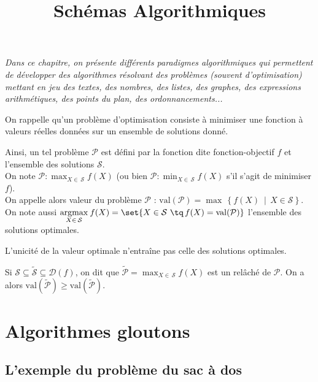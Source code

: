 \documentclass{scrartcl}
\title{Schémas Algorithmiques}
\author{}
\date{}
\newcommand{\1}{\bbm{1}}
\begin{document}
	\maketitle
	\begin{center}
		\textsl{Dans ce chapitre, on présente différents paradigmes algorithmiques qui permettent de développer des algorithmes résolvant des problèmes (souvent d'optimisation) mettant en jeu des textes, des nombres, des listes, des graphes, des expressions arithmétiques, des points du plan, des ordonnancements...}
	\end{center}
	
	 On rappelle qu'un problème d'optimisation consiste à minimiser une fonction à valeurs réelles données sur un ensemble de solutions donné.

	 Ainsi, un tel problème $\mathcal{P}$ est défini par la fonction dite fonction-objectif $f$ et l'ensemble des solutions $\mathcal{S}$. \\
	On note 
	$\mathcal{P} : \max_{X \in \, \mathcal{S}} f(X) $ 
	(ou bien $ \mathcal{P} : \min_{X \in \, \mathcal{S}} f(X) $ s'il s'agit de minimiser $f$). \\
	On appelle alors valeur du problème $\mathcal{P}$ :
	$\mathrm{val} (\mathcal{P}) = \max \, \! \left\{ f(X) \ \middle| \, X \in \mathcal{S} \right\} $. \\
	On note aussi $\displaystyle \underset{X \in \, \mathcal{S}}{\mathrm{argmax}} \: f(X) = \set{X \in \mathcal{S} \ \tq \, f(X) = \mathrm{val} (\mathcal{P})}$ l'ensemble des solutions optimales.

	\rem L'unicité de la valeur optimale n'entraîne pas celle des solutions optimales.

	\rem Si \( \mathcal{S} \subseteq \widetilde{\mathcal{S}} \subseteq \mathcal{D} (f)\), on dit que \( \widetilde{\mathcal{P}} = \displaystyle \max_{X \in \, \mathcal{S}} f(X) \) est un relâché de $\mathcal{P}$. 
	On a alors \( \mathrm{val} (\widetilde{\mathcal{P}}) \geq \mathrm{val} (\widetilde{\mathcal{P}}) \).
	
	\section{Algorithmes gloutons}
	
		\subsection{L'exemple du problème du sac à dos}
		
\end{document}

